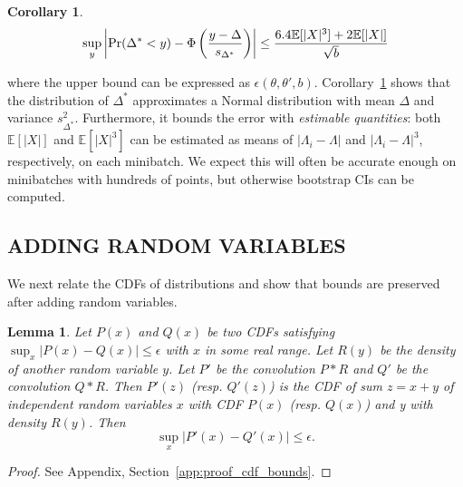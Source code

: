 \documentclass[letterpaper]{article}
\newcommand{\mE}{\mathbb{E}}
\newtheorem{lemma}{Lemma}
\newtheorem{corollary}{Corollary}
\begin{document}
\begin{corollary}\label{cor:our_bound_delta_prime}
\small
\begin{equation}
\sup_y \left|{\rm Pr}(\Delta^*< y) -\Phi\left(\frac{y-\Delta}{s_{\Delta^*}}\right)\right| \leq \frac{6.4\mE[|X|^3]+2\mE[|X|]}{\sqrt{b}}
\end{equation}
\normalsize
\end{corollary} %
where the upper bound can be expressed as $\epsilon(\theta,\theta',b)$.
Corollary~\ref{cor:our_bound_delta_prime} shows that the distribution of
$\Delta^*$ approximates a Normal distribution with mean $\Delta$ and variance
$s^2_{\Delta^*}$. Furthermore, it bounds the error with \emph{estimable
quantities}: both $\mE[|X|]$ and $\mE[|X|^3]$ can be estimated as means of
$|\Lambda_i - \Lambda|$ and $|\Lambda_i - \Lambda|^3$, respectively, on each
minibatch. We expect this will often be accurate enough on minibatches with
hundreds of points, but otherwise bootstrap CIs can be computed.

\subsection{ADDING RANDOM VARIABLES}\label{ssec:preserve_bounds}

We next relate the CDFs of distributions and show that bounds are preserved
after adding random variables.

\begin{lemma}\label{lem:cdf_bounds}
Let $P(x)$ and $Q(x)$ be two CDFs satisfying
$\sup_x|P(x)-Q(x)|\leq \epsilon$ with $x$ in some real range. Let $R(y)$ be the
{\em density} of another random variable $y$. Let $P'$ be the convolution $P*R$
and $Q'$ be the convolution $Q*R$. Then $P'(z)$ (resp. $Q'(z)$) is the CDF of
sum $z=x+y$ of independent random variables $x$ with CDF $P(x)$ (resp. $Q(x)$)
and y with density $R(y)$.  Then
\begin{equation}
    \sup_x|P'(x)-Q'(x)|\leq \epsilon.
\end{equation}
\end{lemma}
\begin{proof}
See Appendix, Section~\ref{app:proof_cdf_bounds}.
\end{proof}
\end{document}
